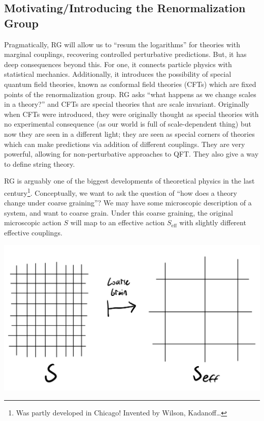 \subsection{Motivating/Introducing the Renormalization Group}
Pragmatically, RG will allow us to ``resum the logarithms'' for theories with marginal couplings, recovering controlled perturbative predictions. But, it has deep consequences beyond this. For one, it connects particle physics with statistical mechanics. Additionally, it introduces the possibility of special quantum field theories, known as conformal field theories (CFTs) which are fixed points of the renormalization group. RG asks ``what happens as we change scales in a theory?'' and CFTs are special theories that are scale invariant. Originally when CFTs were introduced, they were originally thought as special theories with no experimental consequence (as our world is full of scale-dependent thing) but now they are seen in a different light; they are seen as special corners of theories which can make predictions via addition of different couplings. They are very powerful, allowing for non-perturbative approaches to QFT. They also give a way to define string theory.

RG is arguably one of the biggest developments of theoretical physics in the last century\footnote{Was partly developed in Chicago! Invented by Wilson, Kadanoff\ldots}. Conceptually, we want to ask the question of ``how does a theory change under coarse graining''? We may have some microscopic description of a system, and want to coarse grain. Under this coarse graining, the original microscopic action $S$ will map to an effective action $S_{\text{eff}}$ with slightly different effective couplings. 

\begin{center}
    \includegraphics[scale=0.3]{Lectures/Figures/lec14-coarsegrain.png}
\end{center}

